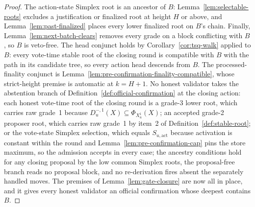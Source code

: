 \begin{proof}
The action-state Simplex root is an ancestor of \(B\):
Lemma~\ref{lem:selectable-roots} excludes a justification or finalized
root at height \(H\) or above, and Lemma~\ref{lem:past-finalized}
places every lower finalized root on \(B\)'s chain.  Finally, Lemma~\ref{lem:next-batch-clears} removes every
grade on a block conflicting with \(B\), so \(B\) is veto-free.  The
head conjunct holds by Corollary~\ref{cor:tsq-walk} applied to \(B\):
every vote-time stable root of the closing round is compatible with \(B\) with
the path in its candidate tree, so every action head descends from
\(B\).  The processed-finality conjunct is
Lemma~\ref{lem:pre-confirmation-finality-compatible}, whose
strict-height premise is automatic at \(k=H+1\).  No honest validator takes the abstention branch of
Definition~\ref{def:official-confirmation} at the closing action: each
honest vote-time root of the closing round is a grade-3 lower root,
which carries raw grade~1 because
\(D_u^{-,1}(X)\subseteq\Phi_{X_u^1}(X)\); an accepted grade-2 proposer
root, which carries raw grade~1 by item~2 of
Definition~\ref{def:stable-root}; or the vote-state Simplex selection,
which equals \(S_{u,\mathrm{act}}\) because activation is constant
within the round and Lemma~\ref{lem:pre-confirmation-cap} pins the
store maximum, so the admission accepts in every case; the ancestry
conditions hold for any closing proposal by the low common Simplex
roots, the proposal-free branch reads no proposal block, and no
re-derivation fires absent the separately handled moves.  The premises
of Lemma~\ref{lem:gate-closure} are now all in place, and it gives
every honest validator an official confirmation whose deepest contains
\(B\).
\end{proof}

